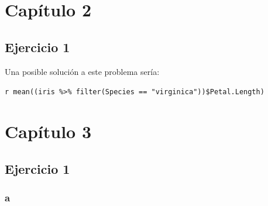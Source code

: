 \documentclass[]{book}
\newenvironment{Shaded}{\begin{snugshade}}{\end{snugshade}}
\newcommand{\KeywordTok}[1]{\textcolor[rgb]{0.13,0.29,0.53}{\textbf{#1}}}
\newcommand{\NormalTok}[1]{#1}
\newcommand{\OperatorTok}[1]{\textcolor[rgb]{0.81,0.36,0.00}{\textbf{#1}}}
\newcommand{\StringTok}[1]{\textcolor[rgb]{0.31,0.60,0.02}{#1}}
\begin{document}
\hypertarget{capitulo-2}{%
\section{Capítulo 2}\label{capitulo-2}}

\hypertarget{ejercicio-1-4}{%
\subsection{Ejercicio 1}\label{ejercicio-1-4}}

Una posible solución a este problema sería:

\texttt{\textasciigrave{}r\ mean((iris\ \%\textgreater{}\%\ filter(Species\ ==\ "virginica"))\$Petal.Length)\textasciigrave{}}

\hypertarget{capitulo-3}{%
\section{Capítulo 3}\label{capitulo-3}}

\hypertarget{ejercicio-1-5}{%
\subsection{Ejercicio 1}\label{ejercicio-1-5}}

\hypertarget{a}{%
\subsubsection{a}\label{a}}

\begin{Shaded}
\end{Shaded}
\end{document}
